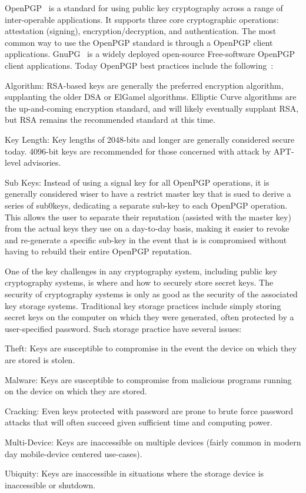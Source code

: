 \documentclass[11pt, twocolumn]{article}
\newenvironment{packed_desc}{
\begin{description}
  \setlength{\itemsep}{1pt}
  \setlength{\parskip}{0pt}
  \setlength{\parsep}{0pt}
}{\end{description}}
\begin{document}
OpenPGP~\cite{openpgp, rfc4880} is a standard for using public key
cryptography across a range of inter-operable applications. It
supports three core cryptographic operations: attestation (signing),
encryption/decryption, and authentication. The most common way to use
the OpenPGP standard is through a OpenPGP client
applications. GnuPG~\cite{gnupg} is a widely deployed open-source
Free-software OpenPGP client applications. Today OpenPGP best
practices include the following~\cite{matt-openpgp}:

\begin{packed_desc}
\item{Algorithm:} RSA-based keys are generally the preferred
  encryption algorithm, supplanting the older DSA or ElGamel
  algorithms. Elliptic Curve algorithms are the up-and-coming
  encryption standard, and will likely eventually supplant RSA, but
  RSA remains the recommended standard at this time.
\item{Key Length:} Key lengths of 2048-bits and longer are generally
  considered secure today. 4096-bit keys are recommended for those
  concerned with attack by APT-level advisories.
\item{Sub Keys:} Instead of using a signal key for all OpenPGP
  operations, it is generally considered wiser to have a restrict
  master key that is sued to derive a series of sub0keys, dedicating a
  separate sub-key to each OpenPGP operation. This allows the user to
  separate their reputation (assisted with the master key) from the
  actual keys they use on a day-to-day basis, making it easier to
  revoke and re-generate a specific sub-key in the event that is is
  compromised without having to rebuild their entire OpenPGP
  reputation.
\end{packed_desc}

One of the key challenges in any cryptography system, including public
key cryptography systems, is where and how to securely store secret
keys. The security of cryptography systems is only as good as the
security of the associated key storage systems. Traditional key
storage practices include simply storing secret keys on the computer
on which they were generated, often protected by a user-specified
password. Such storage practice have several issues:

\begin{packed_desc}
\item{Theft:} Keys are susceptible to compromise in the event the device on
  which they are stored is stolen.
\item{Malware:} Keys are susceptible to compromise from malicious programs
  running on the device on which they are stored.
\item{Cracking:} Even keys protected with password are prone to brute force
  password attacks that will often succeed given sufficient time and
  computing power.
\item{Multi-Device:} Keys are inaccessible on multiple devices (fairly common in
  modern day mobile-device centered use-cases).
\item{Ubiquity:} Keys are inaccessible in situations where the storage device is
  inaccessible or shutdown.
\end{packed_desc}
\end{document}

